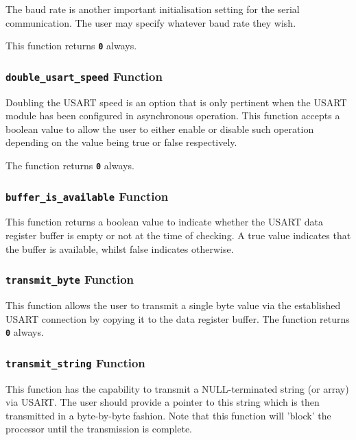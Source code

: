 \documentclass[a4paper, oneside, 11pt, titlepage, onecolumn, openright]{article}
\begin{document}
			The baud rate is another important initialisation setting for the serial communication. The user may specify whatever baud rate they wish.
					
			This function returns \textbf{\texttt{0}} always.

\subsubsection{\textbf{\texttt{double\_usart\_speed}} Function}
			\label{sss:HALusartdouble_usart_speedFunction}
			
			Doubling the USART speed is an option that is only pertinent when the USART module has been configured in asynchronous operation. This function accepts a boolean value to allow the user to either enable or disable such operation depending on the value being true or false respectively.
			
			The function returns \textbf{\texttt{0}} always.

\subsubsection{\textbf{\texttt{buffer\_is\_available}} Function}
			\label{sss:HALusartbuffer_is_availableFunction}
			
			This function returns a boolean value to indicate whether the USART data register buffer is empty or not at the time of checking. A true value indicates that the buffer is available, whilst false indicates otherwise.
			
\subsubsection{\textbf{\texttt{transmit\_byte}} Function}
			\label{sss:HALusarttransmit_byteFunction}
			
			This function allows the user to transmit a single byte value via the established USART connection by copying it to the data register buffer. 		
			The function returns \textbf{\texttt{0}} always.
			
\subsubsection{\textbf{\texttt{transmit\_string}} Function}
			\label{sss:HALusarttransmit_stringFunction}
			
			This function has the capability to transmit a NULL-terminated string (or array) via USART. The user should provide a pointer to this string which is then transmitted in a byte-by-byte fashion. Note that this function will 'block' the processor until the transmission is complete.
			
\end{document}
